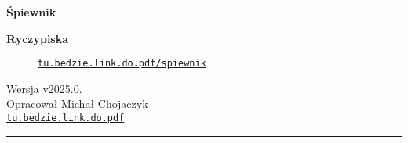\begin{titlepage} %
    \begin{center}
        \parbox[t]{0.93\textwidth}{ %
            \parbox[t]{0.91\textwidth}{ %
                \sffamily
                \center
                
                \vspace{0.7cm} %
                
                \fontsize{80pt}{90pt}\selectfont
                \textbf{Śpiewnik}\par
            
                \fontsize{50pt}{80pt}\selectfont
                \textbf{Ryczypiska}\par

                \vspace{0.7cm} %
            }
        }
    
    \vfill %
    \begin{figure}[h]
        \centering
        \href{http://tu.bedzie.link.do.pdf/spiewnik/}
        \href{http://tu.bedzie.link.do.pdf/spiewnik/}{{\Large\texttt{tu.bedzie.link.do.pdf/spiewnik}}}
    \end{figure}
    \end{center}
    \vfill
    
    \parbox[t]{0.93\textwidth}{ %
        \raggedleft %
        \large %
        {\Large Wersja v2025.0\fi.\AKZSBversion}\\[4pt] %
        Opracował Michał Chojaczyk\\[4pt] %
        \href{http://tu.bedzie.link.do.pdf/}{\texttt{tu.bedzie.link.do.pdf}}\\
        
        \hfill\rule{0.2\linewidth}{1pt}%
    }
    
\end{titlepage}